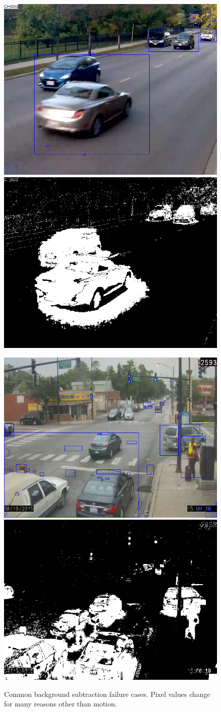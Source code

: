 \begin{figure}[!htbp]
\begin{minipage}{0.96\columnwidth}
    \end{minipage}
    \vfill
    \begin{minipage}{0.96\columnwidth}
        \includegraphics[width=0.48\linewidth, height = 0.3\linewidth]{./img/bg/ILCHI_CHI003.png}
        \includegraphics[width=0.48\linewidth, height = 0.3\linewidth]{./img/bg/ILCHI_CHI003_FG.png}  
        \label{subfig:bg-occlusion}
    \end{minipage}
    \hspace{0.02\columnwidth}
    \begin{minipage}{0.96\columnwidth}
        \includegraphics[width=0.48\linewidth, height = 0.3\linewidth]{./img/bg/halsted.png}
        \includegraphics[width=0.48\linewidth, height = 0.3\linewidth]{./img/bg/halsted_FG.png}  
        \label{subfig:bg-ghost}
    \end{minipage}
    \caption{Common background subtraction failure cases. Pixel values change for many reasons other than motion.}
    \label{fig:tracker-bg}
\end{figure}